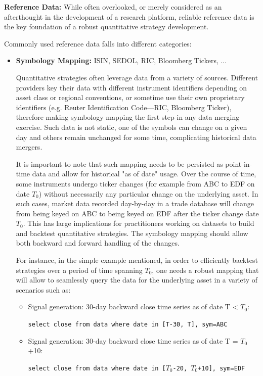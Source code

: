 \noindent\textbf{Reference Data:} While often overlooked, or merely considered as an afterthought in the development of a research platform, reliable reference data is the key foundation of a robust quantitative strategy development.


Commonly used reference data falls into different categories:
\begin{itemize}
\item \textbf{Symbology Mapping:} ISIN, SEDOL, RIC, Bloomberg Tickers, ... 

Quantitative strategies often leverage data from a variety of sources. Different providers key their data with different instrument identifiers depending on asset class or regional conventions, or sometime use their own proprietary identifiers (e.g. Reuter Identification Code---RIC, Bloomberg Ticker), therefore making symbology mapping the first step in any data merging exercise. Such data is not static, one of the symbols can change on a given day and others remain unchanged for some time, complicating historical data mergers.


It is important to note that such mapping needs to be persisted as point-in-time data and allow for historical "as of date" usage. Over the course of time, some instruments undergo ticker changes (for example from ABC to EDF on date $T_0$) without necessarily any particular change on the underlying asset. In such cases, market data recorded day-by-day in a trade database will change from being keyed on ABC to being keyed on EDF after the ticker change date $T_0$. This has large implications for practitioners working on datasets to build and backtest quantitative strategies. The symbology mapping should allow both backward and forward handling of the changes.


For instance, in the simple example mentioned, in order to efficiently backtest strategies over a period of time spanning $T_0$, one needs a robust mapping that will allow to seamlessly query the data for the underlying asset in a variety of scenarios such as:
\begin{itemize}
\item Signal generation: 30-day backward close time series as of date T < $T_0$:

{\tt select close from data where date in [T-30,  T], sym=ABC}

\item Signal generation: 30-day backward close time series as of date T = $T_0$+10:

{\tt select close from data where date in [$T_0$-20,  $T_0$+10], sym=EDF}


\end{itemize}
\end{itemize}
